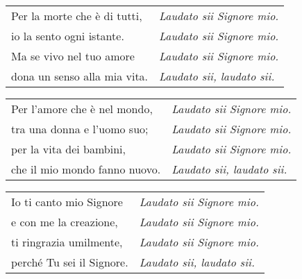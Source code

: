 \spazio


\spazio

\begin{tabular}{@{} p{5.5cm} p{5cm}}
Per la morte che è di tutti, & \emph{Laudato sii Signore mio.}\\
io la sento ogni istante. & \emph{Laudato sii Signore mio.}\\
Ma se vivo nel tuo amore & \emph{Laudato sii Signore mio.}\\
dona un senso alla mia vita. & \emph{Laudato sii, laudato sii.}
\end{tabular}

\spazio

\begin{tabular}{@{} p{5.5cm} p{5cm}}
Per l'amore che è nel mondo, & \emph{Laudato sii Signore mio.}\\
tra una donna e l'uomo suo; & \emph{Laudato sii Signore mio.}\\
per la vita dei bambini, & \emph{Laudato sii Signore mio.}\\
che il mio mondo fanno nuovo. & \emph{Laudato sii, laudato sii.}
\end{tabular}

\spazio


\spazio

\begin{tabular}{@{} p{5.5cm} p{5cm}}
Io ti canto mio Signore & \emph{Laudato sii Signore mio.}\\
e con me la creazione, & \emph{Laudato sii Signore mio.}\\
ti ringrazia umilmente, & \emph{Laudato sii Signore mio.}\\
perché Tu sei il Signore. & \emph{Laudato sii, laudato sii.}
\end{tabular}

\spazio

